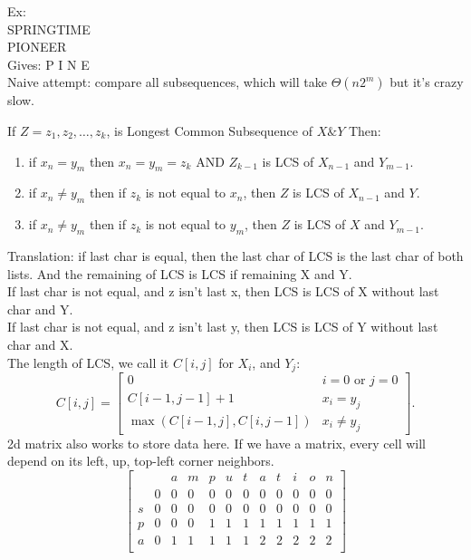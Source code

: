 \begin{itemize}
\begin{example}
			Ex:\\
			SPRINGTIME\\
			PIONEER\\
			Gives: P I N E\\
			Naive attempt: compare all subsequences, which will take $\Theta\left( n 2^{m} \right) $ but it's crazy slow.
		\end{example}
		\begin{theorem}
			If $Z = z_1, z_2, \ldots, z_k$, is Longest Common Subsequence of $X \& Y$ Then:
			\begin{enumerate}
				\item if $x_{n} = y_{m}$ then $x_{n}=y_{m}=z_{k}$ AND $Z_{k-1}$ is LCS of $X_{n-1}$ and $Y_{m-1}$.
				\item if $x_{n} \neq y_{m}$ then if $z_{k}$ is not equal to $x_{n}$, then $Z$ is LCS of $X_{n-1}$ and $Y$.
				\item if $x_{n} \neq y_{m}$ then if $z_{k}$ is not equal to $y_{m}$, then $Z$ is LCS of $X$ and $Y_{m-1}$.
			\end{enumerate}
			Translation: if last char is equal, then the last char of LCS is the last char of both lists. And the remaining of LCS is LCS if remaining X and Y.\\
			If last char is not equal, and z isn't last x, then LCS is LCS of X without last char and Y.\\
			If last char is not equal, and z isn't last y, then LCS is LCS of Y without last char and X.\\
			The length of LCS, we call it $C[i,j]$ for  $X_i$, and  $Y_j$:\\
			 \[
				 C[i,j] = \begin{bmatrix} 0 & i=0 \text{ or } j=0\\
				 C[i-1, j-1] + 1 & x_i = y_j\\
			 \max\left( C[i-1, j], C[i, j-1] \right) & x_i \neq y_j\end{bmatrix} 
			.\] 
			2d matrix also works to store data here. If we have a matrix, every cell will depend on its left, up, top-left corner neighbors.\\
			$$
\begin{bmatrix} 
  &   & a & m & p & u & t & a & t & i & o & n\\
  & 0 & 0 & 0 & 0 & 0 & 0 & 0 & 0 & 0 & 0 & 0\\
s & 0 & 0 & 0 & 0 & 0 & 0 & 0 & 0 & 0 & 0 & 0\\
p & 0 & 0 & 0 & 1 & 1 & 1 & 1 & 1 & 1 & 1 & 1\\
a & 0 & 1 & 1 & 1 & 1 & 1 & 2 & 2 & 2 & 2 & 2\\

\end{bmatrix}$$
\end{theorem}
\end{itemize}
